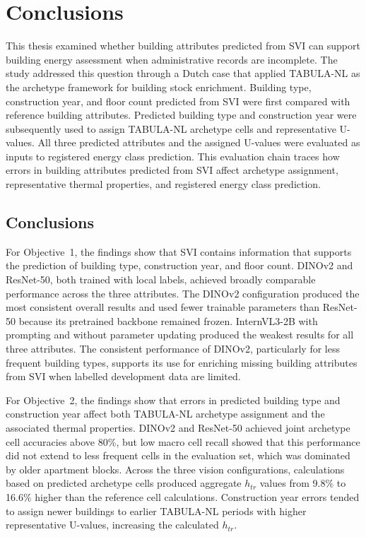 \chapter{Conclusions}
\label{ch:conclusions}

This thesis examined whether building attributes predicted from \ac{SVI} can support building energy assessment when administrative records are incomplete. The study addressed this question through a Dutch case that applied TABULA-NL as the archetype framework for building stock enrichment. Building type, construction year, and floor count predicted from \ac{SVI} were first compared with reference building attributes. Predicted building type and construction year were subsequently used to assign TABULA-NL archetype cells and representative U-values. All three predicted attributes and the assigned U-values were evaluated as inputs to registered energy class prediction. This evaluation chain traces how errors in building attributes predicted from \ac{SVI} affect archetype assignment, representative thermal properties, and registered energy class prediction.

\section{Conclusions}
\label{sec:conclusions}

For Objective~1, the findings show that \ac{SVI} contains information that supports the prediction of building type, construction year, and floor count. DINOv2 and ResNet-50, both trained with local labels, achieved broadly comparable performance across the three attributes. The DINOv2 configuration produced the most consistent overall results and used fewer trainable parameters than ResNet-50 because its pretrained backbone remained frozen. InternVL3-2B with prompting and without parameter updating produced the weakest results for all three attributes. The consistent performance of DINOv2, particularly for less frequent building types, supports its use for enriching missing building attributes from \ac{SVI} when labelled development data are limited.

For Objective~2, the findings show that errors in predicted building type and construction year affect both TABULA-NL archetype assignment and the associated thermal properties. DINOv2 and ResNet-50 achieved joint archetype cell accuracies above 80\%, but low macro cell recall showed that this performance did not extend to less frequent cells in the evaluation set, which was dominated by older apartment blocks. Across the three vision configurations, calculations based on predicted archetype cells produced aggregate $h_{tr}$ values from 9.8\% to 16.6\% higher than the reference cell calculations. Construction year errors tended to assign newer buildings to earlier TABULA-NL periods with higher representative U-values, increasing the calculated $h_{tr}$.

